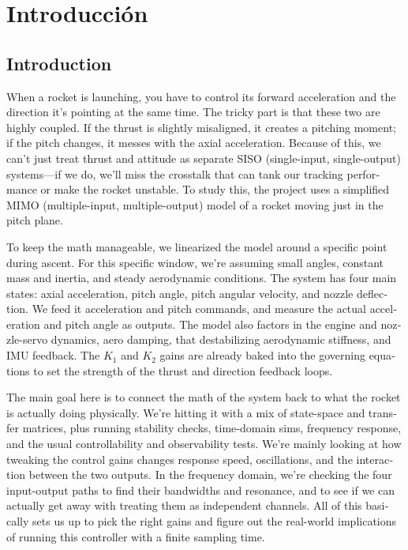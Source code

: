 \documentclass[article, 11pt]{IEEEtran}   %
\begin{document}
\section{Introducci\'on}
\begin{otherlanguage}{english}
\section{Introduction}
When a rocket is launching, you have to control its forward acceleration and the direction it's pointing at the same time. The tricky part is that these two are highly coupled. If the thrust is slightly misaligned, it creates a pitching moment; if the pitch changes, it messes with the axial acceleration. Because of this, we can't just treat thrust and attitude as separate SISO (single-input, single-output) systems—if we do, we'll miss the crosstalk that can tank our tracking performance or make the rocket unstable. To study this, the project uses a simplified MIMO (multiple-input, multiple-output) model of a rocket moving just in the pitch plane.

To keep the math manageable, we linearized the model around a specific point during ascent. For this specific window, we're assuming small angles, constant mass and inertia, and steady aerodynamic conditions. The system has four main states: axial acceleration, pitch angle, pitch angular velocity, and nozzle deflection. We feed it acceleration and pitch commands, and measure the actual acceleration and pitch angle as outputs. The model also factors in the engine and nozzle-servo dynamics, aero damping, that destabilizing aerodynamic stiffness, and IMU feedback. The $K_1$ and $K_2$ gains are already baked into the governing equations to set the strength of the thrust and direction feedback loops.

The main goal here is to connect the math of the system back to what the rocket is actually doing physically. We're hitting it with a mix of state-space and transfer matrices, plus running stability checks, time-domain sims, frequency response, and the usual controllability and observability tests. We're mainly looking at how tweaking the control gains changes response speed, oscillations, and the interaction between the two outputs. In the frequency domain, we're checking the four input-output paths to find their bandwidths and resonance, and to see if we can actually get away with treating them as independent channels. All of this basically sets us up to pick the right gains and figure out the real-world implications of running this controller with a finite sampling time.

\end{otherlanguage}
\end{document}
